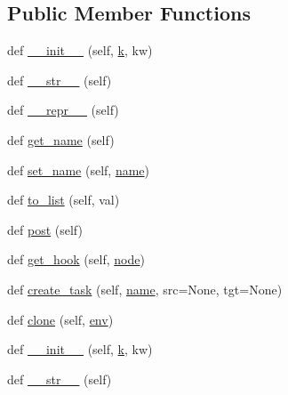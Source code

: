 \subsection*{Public Member Functions}
\begin{DoxyCompactItemize}
\item 
def \hyperlink{classwaflib_1_1_task_gen_1_1task__gen_a17ba35bed2219481190d515ffef57404}{\+\_\+\+\_\+init\+\_\+\+\_\+} (self, \hyperlink{rfft2d_test_m_l_8m_adc468c70fb574ebd07287b38d0d0676d}{k}, kw)
\item 
def \hyperlink{classwaflib_1_1_task_gen_1_1task__gen_a48c763160308a6ff809b7048702618b1}{\+\_\+\+\_\+str\+\_\+\+\_\+} (self)
\item 
def \hyperlink{classwaflib_1_1_task_gen_1_1task__gen_a040db536e5d7fe5054c9e9da52f36eb0}{\+\_\+\+\_\+repr\+\_\+\+\_\+} (self)
\item 
def \hyperlink{classwaflib_1_1_task_gen_1_1task__gen_a50370e76b549fc3bd0369c35f4fc1bab}{get\+\_\+name} (self)
\item 
def \hyperlink{classwaflib_1_1_task_gen_1_1task__gen_a79705c7a6b9b09021ee549e428c5a5c1}{set\+\_\+name} (self, \hyperlink{lib_2expat_8h_a1b49b495b59f9e73205b69ad1a2965b0}{name})
\item 
def \hyperlink{classwaflib_1_1_task_gen_1_1task__gen_a31a9f508654465cd5fe9f3baaaf77ec4}{to\+\_\+list} (self, val)
\item 
def \hyperlink{classwaflib_1_1_task_gen_1_1task__gen_aa00dedae17f7fa03c169f0e4bdab7414}{post} (self)
\item 
def \hyperlink{classwaflib_1_1_task_gen_1_1task__gen_a19b53157d4411479cf8f55e0ef0edfec}{get\+\_\+hook} (self, \hyperlink{structnode}{node})
\item 
def \hyperlink{classwaflib_1_1_task_gen_1_1task__gen_ad432ecefdf2362d1cccf1dad31fac2d3}{create\+\_\+task} (self, \hyperlink{lib_2expat_8h_a1b49b495b59f9e73205b69ad1a2965b0}{name}, src=None, tgt=None)
\item 
def \hyperlink{classwaflib_1_1_task_gen_1_1task__gen_a7b7e036b797a0532ce6be8df951ba048}{clone} (self, \hyperlink{classwaflib_1_1_task_gen_1_1task__gen_a4d6f968ce8718fdf77d46ea3b56def1e}{env})
\item 
def \hyperlink{classwaflib_1_1_task_gen_1_1task__gen_a17ba35bed2219481190d515ffef57404}{\+\_\+\+\_\+init\+\_\+\+\_\+} (self, \hyperlink{rfft2d_test_m_l_8m_adc468c70fb574ebd07287b38d0d0676d}{k}, kw)
\item 
def \hyperlink{classwaflib_1_1_task_gen_1_1task__gen_a48c763160308a6ff809b7048702618b1}{\+\_\+\+\_\+str\+\_\+\+\_\+} (self)

\end{DoxyCompactItemize}
